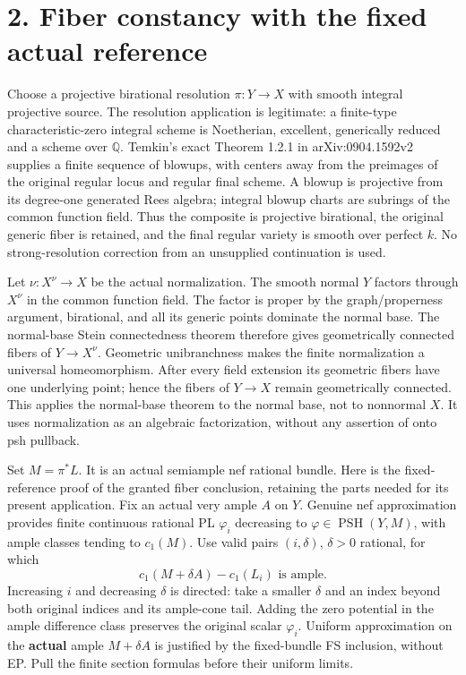 \documentclass[
  10pt,
]{article}
\begin{document}
\section{2. Fiber constancy with the fixed actual
reference}\label{fiber-constancy-with-the-fixed-actual-reference}

Choose a projective birational resolution \(\pi:Y\to X\) with smooth
integral projective source. The resolution application is legitimate: a
finite-type characteristic-zero integral scheme is Noetherian,
excellent, generically reduced and a scheme over \(\mathbb Q\). Temkin's
exact Theorem 1.2.1 in arXiv:0904.1592v2 supplies a finite sequence of
blowups, with centers away from the preimages of the original regular
locus and regular final scheme. A blowup is projective from its
degree-one generated Rees algebra; integral blowup charts are subrings
of the common function field. Thus the composite is projective
birational, the original generic fiber is retained, and the final
regular variety is smooth over perfect \(k\). No strong-resolution
correction from an unsupplied continuation is used.

Let \(\nu:X^\nu\to X\) be the actual normalization. The smooth normal
\(Y\) factors through \(X^\nu\) in the common function field. The factor
is proper by the graph/properness argument, birational, and all its
generic points dominate the normal base. The normal-base Stein
connectedness theorem therefore gives geometrically connected fibers of
\(Y\to X^\nu\). Geometric unibranchness makes the finite normalization a
universal homeomorphism. After every field extension its geometric
fibers have one underlying point; hence the fibers of \(Y\to X\) remain
geometrically connected. This applies the normal-base theorem to the
normal base, not to nonnormal \(X\). It uses normalization as an
algebraic factorization, without any assertion of onto psh pullback.

Set \(M=\pi^*L\). It is an actual semiample nef rational bundle. Here is
the fixed-reference proof of the granted fiber conclusion, retaining the
parts needed for its present application. Fix an actual very ample \(A\)
on \(Y\). Genuine nef approximation provides finite continuous rational
PL \(\varphi_i\) decreasing to \(\varphi\in\operatorname{PSH}(Y,M)\),
with ample classes tending to \(c_1(M)\). Use valid pairs
\((i,\delta)\), \(\delta>0\) rational, for which
\[c_1(M+\delta A)-c_1(L_i)\text{ is ample}.\] Increasing \(i\) and
decreasing \(\delta\) is directed: take a smaller \(\delta\) and an
index beyond both original indices and its ample-cone tail. Adding the
zero potential in the ample difference class preserves the original
scalar \(\varphi_i\). Uniform approximation on the \textbf{actual} ample
\(M+\delta A\) is justified by the fixed-bundle FS inclusion, without
EP. Pull the finite section formulas before their uniform limits.
\end{document}
